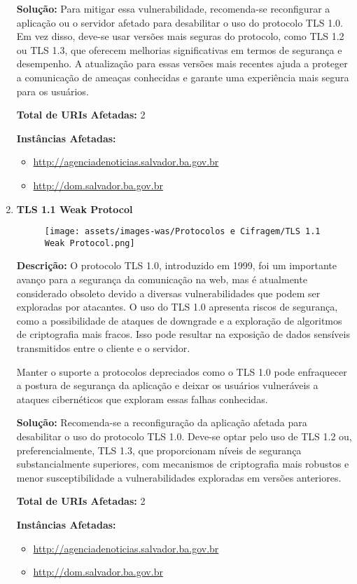 \documentclass[a4paper,12pt]{article}
\begin{document}
\begin{enumerate}
\textbf{Solução:} Para mitigar essa vulnerabilidade, recomenda-se reconfigurar a aplicação ou o servidor afetado para desabilitar o uso do protocolo TLS 1.0. Em vez disso, deve-se usar versões mais seguras do protocolo, como TLS 1.2 ou TLS 1.3, que oferecem melhorias significativas em termos de segurança e desempenho. A atualização para essas versões mais recentes ajuda a proteger a comunicação de ameaças conhecidas e garante uma experiência mais segura para os usuários.

\textbf{Total de URIs Afetadas:} 2

\textbf{Instâncias Afetadas:}
\begin{itemize}
    \item \url{http://agenciadenoticias.salvador.ba.gov.br}
    \item \url{http://dom.salvador.ba.gov.br}
\end{itemize}

\item \textbf{TLS 1.1 Weak Protocol}

                        \begin{figure}[h!]
                        \centering
                        \texttt{[image: assets/images-was/Protocolos e Cifragem/TLS 1.1 Weak Protocol.png]}
                        \end{figure}
                        \FloatBarrier
                        \textbf{Descrição:} O protocolo TLS 1.0, introduzido em 1999, foi um importante avanço para a segurança da comunicação na web, mas é atualmente considerado obsoleto devido a diversas vulnerabilidades que podem ser exploradas por atacantes. O uso do TLS 1.0 apresenta riscos de segurança, como a possibilidade de ataques de downgrade e a exploração de algoritmos de criptografia mais fracos. Isso pode resultar na exposição de dados sensíveis transmitidos entre o cliente e o servidor.

    Manter o suporte a protocolos depreciados como o TLS 1.0 pode enfraquecer a postura de segurança da aplicação e deixar os usuários vulneráveis a ataques cibernéticos que exploram essas falhas conhecidas.

\textbf{Solução:} Recomenda-se a reconfiguração da aplicação afetada para desabilitar o uso do protocolo TLS 1.0. Deve-se optar pelo uso de TLS 1.2 ou, preferencialmente, TLS 1.3, que proporcionam níveis de segurança substancialmente superiores, com mecanismos de criptografia mais robustos e menor susceptibilidade a vulnerabilidades exploradas em versões anteriores.

\textbf{Total de URIs Afetadas:} 2

\textbf{Instâncias Afetadas:}
\begin{itemize}
    \item \url{http://agenciadenoticias.salvador.ba.gov.br}
    \item \url{http://dom.salvador.ba.gov.br}
\end{itemize}

\end{enumerate}
\end{document}
